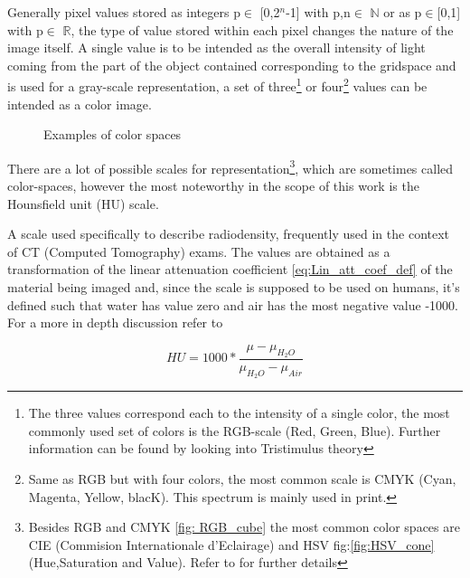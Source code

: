 Generally pixel values stored as integers p$\in$ [0,2$^{n}$-1] with p,n$\in$ $\mathbb{N}$  or as p$\in$[0,1] with p$\in$ $\mathbb{R}$, the type of value stored within each pixel changes the nature of the image itself.
A single value is to be intended as the overall intensity of light coming from the part of the object contained corresponding to the gridspace and is used for a gray-scale representation, a set of three\footnote{The three values correspond each to the intensity of a single color, the most commonly used set of colors is the RGB-scale (Red, Green, Blue). Further information can be found by looking into Tristimulus theory\cite{Tristimulus}}  or four\footnote{Same as RGB but with four colors, the most common scale is CMYK (Cyan, Magenta, Yellow, blacK). This spectrum is mainly used in print.} values can be intended as a color image.

\begin{figure}[H]
     \centering
    \qquad
     \caption{Examples of color spaces}
     \label{fig:color_spaces}
\end{figure}

There are a lot of possible scales for representation\footnote{Besides RGB and CMYK \ref{fig: RGB_cube} the most common color spaces are CIE (Commision Internationale d’Eclairage) and HSV fig:\ref{fig:HSV_cone} (Hue,Saturation and Value). Refer to \cite{Color_spaces} for further details}, which are sometimes called color-spaces, however the most noteworthy in the scope of this work is the Hounsfield unit (HU) scale.

\begin{definition}
A scale used specifically to describe radiodensity, frequently used in the context of CT (Computed Tomography) exams. The values are obtained as a transformation of the linear attenuation coefficient \ref{eq:Lin_att_coef_def} of the material being imaged and, since the scale is supposed to be used on humans, it's defined such that water has value zero and air has the most negative value -1000. For  a more in depth discussion refer to \cite{Hounsfield}
\end{definition}

\begin{equation}\label{eq:HU_def}
    HU = 1000*\frac{\mu - \mu_{H_2O}}{\mu_{H_2O} - \mu_{Air}}
\end{equation}

